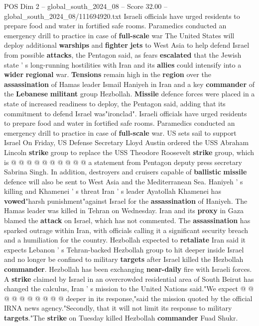 \begin{textsample}{POS Dim 2 – global\_south\_2024\_08 – Score 32.00 – global\_south\_2024\_08/111694920.txt}  \label{ex:f2_pos_006}
Israeli officials have urged residents to prepare food and water in fortified safe rooms.
Paramedics conducted an emergency drill to practice in case of \textbf{full-scale} war The United States will deploy additional \textbf{warships} and \textbf{fighter} \textbf{jets} to West Asia to help defend Israel from possible \textbf{attacks}, the Pentagon said, as fears \textbf{escalated} that the Jewish state ' s long-running hostilities with Iran and its \textbf{allies} could intensify into a \textbf{wider} \textbf{regional} war. \textbf{Tensions} remain high in the \textbf{region} over the \textbf{assassination} of Hamas leader Ismail Haniyeh in Iran and a key \textbf{commander} of the \textbf{Lebanese} \textbf{militant} group Hezbollah. \textbf{Missile} defence forces were placed in a state of increased readiness to deploy, the Pentagon said, adding that its commitment to defend Israel was"ironclad".
Israeli officials have urged residents to prepare food and water in fortified safe rooms.
Paramedics conducted an emergency drill to practice in case of \textbf{full-scale} war.
US sets sail to support Israel On Friday, US Defense Secretary Lloyd Austin ordered the USS Abraham Lincoln \textbf{strike} group to replace the USS Theodore Roosevelt \textbf{strike} group, which is @ @ @ @ @ @ @ @ @ @ a statement from Pentagon deputy press secretary Sabrina Singh.
In addition, destroyers and cruisers capable of \textbf{ballistic} \textbf{missile} defence will also be sent to West Asia and the Mediterranean Sea.
Haniyeh ' s killing and Khamenei ' s threat Iran ' s leader Ayatollah Khamenei has \textbf{vowed}"harsh punishment"against Israel for the \textbf{assassination} of Haniyeh.
The Hamas leader was killed in Tehran on Wednesday.
Iran and its \textbf{proxy} in Gaza blamed the \textbf{attack} on Israel, which has not commented.
The \textbf{assassination} has sparked outrage within Iran, with officials calling it a significant security breach and a humiliation for the country.
Hezbollah expected to \textbf{retaliate} Iran said it expects Lebanon ' s Tehran-backed Hezbollah group to hit deeper inside Israel and no longer be confined to military \textbf{targets} after Israel killed the Hezbollah \textbf{commander}.
Hezbollah has been exchanging \textbf{near-daily} fire with Israeli forces.
A \textbf{strike} claimed by Israel in an overcrowded residential area of South Beirut has changed the calculus, Iran ' s mission to the United Nations said."We expect @ @ @ @ @ @ @ @ @ @ deeper in its response,"said the mission quoted by the official IRNA news agency."Secondly, that it will not limit its response to military \textbf{targets}."The \textbf{strike} on Tuesday killed Hezbollah \textbf{commander} Fuad Shukr.

\end{textsample}
